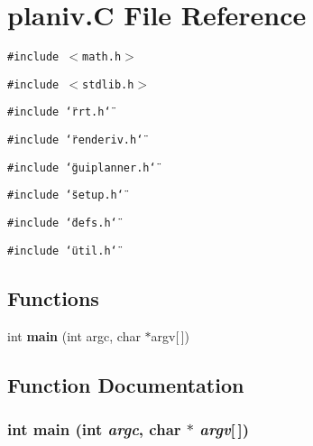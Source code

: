 \section{planiv.C File Reference}
\label{planiv_8C}
{\tt \#include $<$math.h$>$}\par
{\tt \#include $<$stdlib.h$>$}\par
{\tt \#include \char`\"{}rrt.h\char`\"{}}\par
{\tt \#include \char`\"{}renderiv.h\char`\"{}}\par
{\tt \#include \char`\"{}guiplanner.h\char`\"{}}\par
{\tt \#include \char`\"{}setup.h\char`\"{}}\par
{\tt \#include \char`\"{}defs.h\char`\"{}}\par
{\tt \#include \char`\"{}util.h\char`\"{}}\par
\subsection*{Functions}
\begin{CompactItemize}
\item 
int {\bf main} (int argc, char $\ast$argv[$\,$])
\end{CompactItemize}


\subsection{Function Documentation}
\subsubsection{\setlength{\rightskip}{0pt plus 5cm}int main (int {\em argc}, char $\ast$ {\em argv}[$\,$])}\label{planiv_8C_a0}


